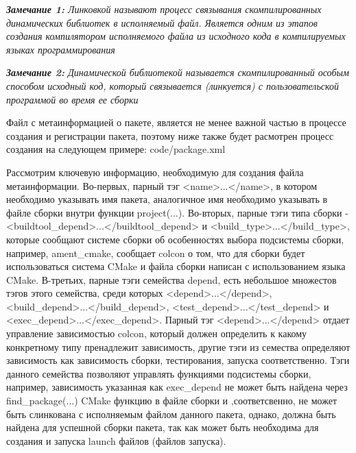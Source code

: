 \documentclass[a4paper, 14pt]{extreport}
\begin{document}
\par\noindent \textsl{\textbf{Замечание 1:} Линковкой называют процесс связывания скомпилированных динамических библиотек в исполняемый файл. Является одним из этапов
 создания компилятором исполняемого файла из исходного кода в компилируемых языках программирования}
\par\noindent \textsl{\textbf{Замечание 2:} Динамической библиотекой называется скомпилированный особым способом исходный код, который связывается (линкуется) с пользовательской программой во время ее сборки}
\par\noindent Файл с метаинформацией о пакете, является не менее важной частью в процессе создания и регистрации пакета, поэтому ниже
 также будет расмотрен процесс создания на следующем примере:
 {code/package.xml} 
\par\noindent Рассмотрим ключевую информацию, необходимую для создания файла метаинформации. Во-первых, парный тэг <name>...</name>,
 в котором необходимо указывать имя пакета, аналогичное имя необходимо указывать в файле сборки внутри функции project(...).
 Во-вторых, парные тэги типа сборки - <buildtool\_depend>...</buildtool\_depend> и <build\_type>...</build\_type>, которые сообщают системе
 сборки об особенностях выбора подсистемы сборки, например, ament\_cmake, сообщает colcon о том, что для сборки будет
 использоваться система CMake и файла сборки написан с использованием языка CMake. В-третьих, парные тэги семейства depend, есть небольшое
 множестов тэгов этого семейства, среди которых <depend>...</depend>, <build\_depend>...</build\_depend>, <test\_depend>...</test\_depend>
 и <exec\_depend>...</exec\_depend>. Парный тэг <depend>...</depend> отдает управление зависимостью colcon, который должен определить
 к какому конкретному типу пренадлежит зависимость, другие тэги из семества определяют зависимость как зависимость сборки, тестирования,
 запуска соответственно. Тэги данного семейства позволяют управлять функциями подсистемы сборки, например, зависимость указанная
 как exec\_depend не может быть найдена через find\_package(...) CMake функцию в файле сборки и ,соответсвенно, не может быть слинкована
 с исполняемым файлом данного пакета, однако, должна быть найдена для успешной сборки пакета, так как может быть необходима для создания
 и запуска launch файлов (файлов запуска). 
\end{document}
